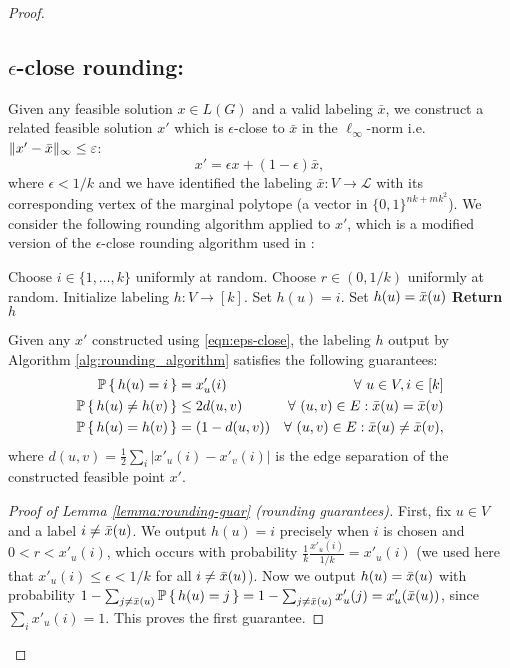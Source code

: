 \begin{proof}
\subsection{$\epsilon$-close rounding:}
Given any feasible solution $x \in L(G)$ and a valid labeling $\bar{x}$, we construct a related feasible solution $x'$ which is $\epsilon$-close to $\bar{x}$ in the $\ell_{\infty}$-norm i.e. $\lVert x' - \bar{x} \rVert_{\infty} \leq \varepsilon$:
\begin{equation}\label{eqn:eps-close}
    x' = \epsilon x + (1-\epsilon)\bar{x},
\end{equation}
where $\epsilon < 1/k$ and we have identified the labeling $\bar{x}:V\to\mathcal{L}$ with its corresponding vertex of the marginal polytope (a vector in $\{0,1\}^{nk+mk^2}$). We consider the following rounding algorithm applied to $x'$, which is a modified version of the $\epsilon$-close rounding algorithm used in \citet{LanSonVij18}:
\begin{algorithm}[H]
   \caption{$\epsilon$-close rounding}
   \label{alg:rounding_algorithm}
\begin{algorithmic}[1]
   \STATE Choose $i \in \{1,\dots,k\}$ uniformly at random.
   \STATE Choose $r \in (0,1/k)$ uniformly at random.
   \STATE Initialize labeling $h: V\to [k]$.
            \STATE Set $h(u) = i$.
        \ELSE
            \STATE Set $h(u) = \bar{x}(u)$
        \ENDIF 
   \ENDFOR
   \STATE \textbf{Return} $h$
\end{algorithmic}
\end{algorithm}

\begin{lemma}
\label{lemma:rounding-guar}
Given any $x'$ constructed using \eqref{eqn:eps-close}, the labeling $h$ output by Algorithm \ref{alg:rounding_algorithm} satisfies the following guarantees:
\begin{align*}
    \mathbb{P}\set{h(u) = i} &= x'_u(i) &\forall\ u\in V, i\in [k]\\
    \mathbb{P}\set{h(u) \ne h(v)} &\le 2d(u,v) &\forall\ (u,v) \in E : \bar{x}(u) = \bar{x}(v)\\
    \mathbb{P}\set{h(u) = h(v)} &= (1-d(u,v)) &\forall\ (u,v) \in E : \bar{x}(u) \ne \bar{x}(v),
\end{align*}
where $d(u,v) = \frac{1}{2}\sum_i|x'_u(i) - x'_v(i)|$ is the edge separation of the constructed feasible point $x'$.
\end{lemma}
\begin{proof}[Proof of Lemma \ref{lemma:rounding-guar} (rounding guarantees)]
First, fix $u\in V$ and a label $i\ne \bar{x}(u)$. We output $h(u) = i$ precisely when $i$ is chosen and $0 < r < x'_u(i)$, which occurs with probability $\frac{1}{k}\frac{x'_u(i)}{1/k} = x'_u(i)$ (we used here that $x'_u(i) \le \epsilon < 1/k$ for all $i\ne \bar{x}(u)$). Now we output $h(u)=\bar{x}(u)$ with probability $1-\sum_{j\ne \bar{x}(u)}\mathbb{P}\set{h(u) = j} = 1-\sum_{j\ne \bar{x}(u)}x'_u(j) = x'_u(\bar{x}(u))$, since $\sum_{i}x'_u(i) = 1$. This proves the first guarantee.


\end{proof}
\end{proof}
